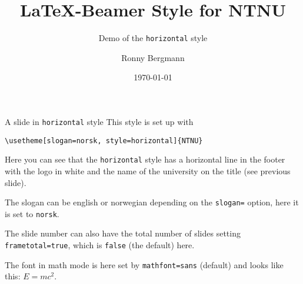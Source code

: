 \documentclass[aspectratio=169]{beamer}
\title{\LaTeX{}-Beamer Style for NTNU}
\subtitle{Demo of the  \texttt{horizontal} style}
\author{Ronny Bergmann}
\date{\today}
\begin{document}
	\maketitle
    \begin{frame}[fragile]{A slide in \texttt{horizontal} style}
        This style is set up with

        \lstinline!\usetheme[slogan=norsk, style=horizontal]{NTNU}!

        Here you can see that the \texttt{horizontal} style has a horizontal line in the footer with the logo in white and the name of the university on the title (see previous slide).

        The slogan can be english or norwegian depending on the \lstinline!slogan=! option, here it is set to \lstinline!norsk!.

        The slide number can also have the total number of slides setting \lstinline!frametotal=true!, which is \lstinline!false! (the default) here.
        
        The font in math mode is here set by \lstinline!mathfont=sans! (default) and looks like this: $E=mc^2$.
    \end{frame}
\end{document}
